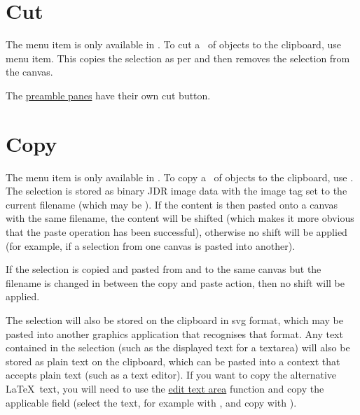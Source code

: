 \section{Cut}\label{sec:cutobjects}


The  menu item is only available in \selectmode.
To cut a \selection\ of \glspl{object} to the
clipboard, use  menu item. This copies the selection
as per  and then removes the selection from the
\gls{canvas}.

\begin{information}
The \hyperref[sec:preamblepanels]{preamble panes} have
their own cut button.
\end{information}

\section{Copy}\label{sec:copyobjects}


The  menu item is only available in \selectmode.
To copy a \selection\ of \glspl{object} to the
clipboard, use . The selection is stored as binary
\gls{JDR} image data with the image tag set to the current filename
(which may be ). If the content is then
pasted onto a \gls{canvas} with the same filename, the content will
be shifted (which makes it more obvious that the paste operation has
been successful), otherwise no shift will be applied (for example,
if a selection from one \gls{canvas} is pasted into another).

\begin{information}
If the selection is copied and pasted from and to the same
\gls{canvas} but the filename is changed in between the copy and
paste action, then no shift will be applied.
\end{information}

The selection will also be stored on the clipboard in \gls{svg}
format, which may be pasted into another graphics application that
recognises that format. Any text contained in the selection (such as
the displayed text for a \gls{textarea}) will also be stored as
plain text on the clipboard, which can be pasted into a context that
accepts plain text (such as a text editor). If you want to copy the
alternative \LaTeX\ text, you will need to use the
\hyperref[sec:edittext]{edit text area} function and copy the
applicable field (select the text, for example with
, and copy with
).

